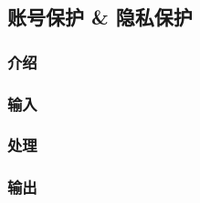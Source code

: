\subsection{账号保护 & 隐私保护}
\subsubsection{介绍}
\subsubsection{输入}
\subsubsection{处理}
\subsubsection{输出}